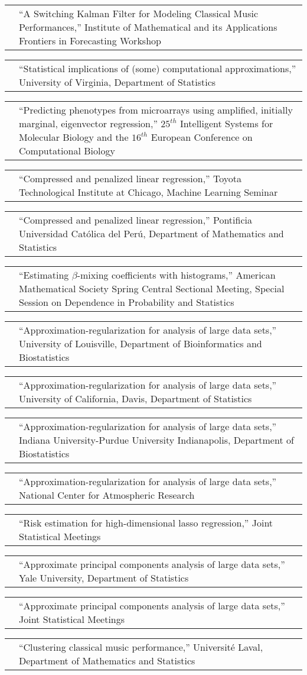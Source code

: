 \documentclass[11pt,letterpaper]{minimal/moderncv}
\makeatletter
\renewcommand*{\cvitem}[2]{%
  \begin{tabular}{@{}p{\hintscolumnwidth}@{\hspace{\separatorcolumnwidth}}%
    p{\maincolumnwidth}@{}}%
    \raggedleft {#1} &  {#2}%
  \end{tabular}%
}
\makeatother
\begin{document}
\cvitem{}{``A Switching Kalman Filter for Modeling Classical Music
  Performances,'' Institute of Mathematical and its Applications
  Frontiers in Forecasting Workshop}

\cvitem{}{ ``Statistical implications of (some) computational approximations,'' University of Virginia, Department of
  Statistics}

\cvitem{2017}{ ``Predicting phenotypes from microarrays using amplified,
  initially marginal, eigenvector regression,'' $25^{th}$ Intelligent
  Systems for Molecular Biology and the $16^{th}$ European Conference
  on Computational Biology}

\cvitem{}{ ``Compressed and penalized linear regression,'' Toyota
  Technological Institute at Chicago, Machine Learning Seminar}

\cvitem{}{ ``Compressed and penalized linear regression,'' Pontificia
  Universidad Cat\'olica del Per\'u, Department of 
  Mathematics and Statistics}

\cvitem{}{ ``Estimating $\beta$-mixing coefficients with histograms,''
  American Mathematical Society Spring Central Sectional Meeting,
  Special Session on Dependence in Probability and Statistics}

\cvitem{2016}{ ``Approximation-regularization for analysis of large data sets,''
  University of Louisville, Department of Bioinformatics and
  Biostatistics}

\cvitem{}{ ``Approximation-regularization for analysis of large data
  sets,''  University of California, Davis, Department of Statistics}

\cvitem{}{ ``Approximation-regularization for analysis of large data
  sets,''  Indiana University-Purdue University Indianapolis, Department
  of Biostatistics}

\cvitem{}{ ``Approximation-regularization for analysis of large data
  sets,''  National Center for Atmospheric Research}

\cvitem{}{ ``Risk estimation for high-dimensional lasso regression,'' Joint
  Statistical Meetings}

\cvitem{2015}{ ``Approximate principal components analysis of large data sets,''
  Yale University, Department of Statistics}

\cvitem{2014}{ ``Approximate principal components analysis of large data sets,''
  Joint Statistical Meetings}

\cvitem{}{ ``Clustering classical music performance,''
  Universit\'e Laval, Department of Mathematics and Statistics}
\end{document}
